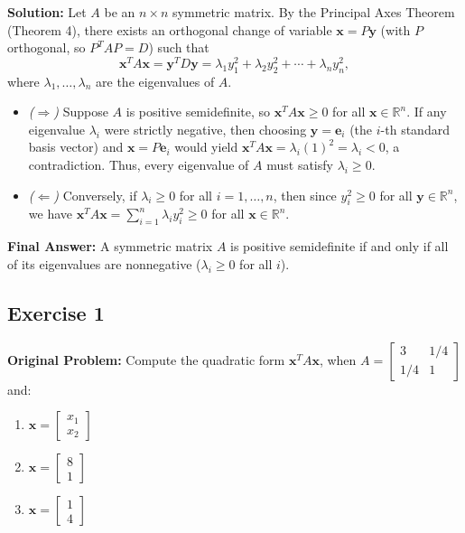\documentclass[11pt, letterpaper]{article}
\theoremstyle{definition}
\theoremstyle{remark}
\begin{document}
\textbf{Solution:}
Let $A$ be an $n \times n$ symmetric matrix. By the Principal Axes Theorem (Theorem 4), there exists an orthogonal change of variable $\mathbf{x} = P\mathbf{y}$ (with $P$ orthogonal, so $P^T A P = D$) such that
\[
\mathbf{x}^T A \mathbf{x} = \mathbf{y}^T D \mathbf{y} = \lambda_1 y_1^2 + \lambda_2 y_2^2 + \cdots + \lambda_n y_n^2,
\]
where $\lambda_1, \dots, \lambda_n$ are the eigenvalues of $A$.
\begin{itemize}
    \item \emph{($\Longrightarrow$)} Suppose $A$ is positive semidefinite, so $\mathbf{x}^T A \mathbf{x} \ge 0$ for all $\mathbf{x} \in \mathbb{R}^n$. If any eigenvalue $\lambda_i$ were strictly negative, then choosing $\mathbf{y} = \mathbf{e}_i$ (the $i$-th standard basis vector) and $\mathbf{x} = P\mathbf{e}_i$ would yield $\mathbf{x}^T A \mathbf{x} = \lambda_i (1)^2 = \lambda_i < 0$, a contradiction. Thus, every eigenvalue of $A$ must satisfy $\lambda_i \ge 0$.
    \item \emph{($\Longleftarrow$)} Conversely, if $\lambda_i \ge 0$ for all $i = 1, \dots, n$, then since $y_i^2 \ge 0$ for all $\mathbf{y} \in \mathbb{R}^n$, we have $\mathbf{x}^T A \mathbf{x} = \sum_{i=1}^n \lambda_i y_i^2 \ge 0$ for all $\mathbf{x} \in \mathbb{R}^n$.
\end{itemize}
\textbf{Final Answer:} A symmetric matrix $A$ is positive semidefinite if and only if all of its eigenvalues are nonnegative ($\lambda_i \ge 0$ for all $i$).

\hrulefill

\subsection*{Exercise 1}
\textbf{Original Problem:} Compute the quadratic form $\mathbf{x}^T A \mathbf{x}$, when $A = \begin{bmatrix} 3 & 1/4 \\ 1/4 & 1 \end{bmatrix}$ and:
\begin{enumerate}[label=\alph*.]
    \item $\mathbf{x} = \begin{bmatrix} x_1 \\ x_2 \end{bmatrix}$
    \item $\mathbf{x} = \begin{bmatrix} 8 \\ 1 \end{bmatrix}$
    \item $\mathbf{x} = \begin{bmatrix} 1 \\ 4 \end{bmatrix}$
\end{enumerate}
\end{document}
